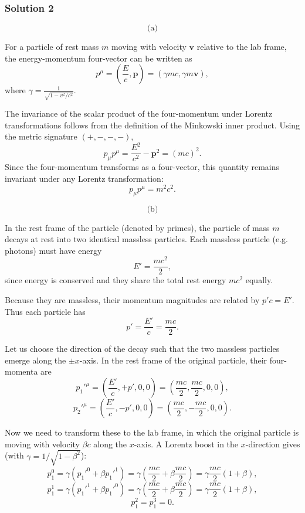\documentclass{article}
\begin{document}
\subsubsection{Solution 2}

\[
\text{(a)}
\]

For a particle of rest mass \(m\) moving with velocity \(\mathbf{v}\) relative to the lab frame, the energy-momentum four-vector can be written as
\[
p^\mu = \left(\frac{E}{c}, \mathbf{p}\right) = \left(\gamma m c, \gamma m \mathbf{v}\right),
\]
where \(\gamma = \frac{1}{\sqrt{1 - v^2/c^2}}\).

The invariance of the scalar product of the four-momentum under Lorentz transformations follows from the definition of the Minkowski inner product. Using the metric signature \((+,-,-,-)\),
\[
p_\mu p^\mu = \frac{E^2}{c^2} - \mathbf{p}^2 = (m c)^2.
\]
Since the four-momentum transforms as a four-vector, this quantity remains invariant under any Lorentz transformation:
\[
p_\mu p^\mu = m^2 c^2.
\]

\[
\text{(b)}
\]

In the rest frame of the particle (denoted by primes), the particle of mass \(m\) decays at rest into two identical massless particles. Each massless particle (e.g. photons) must have energy
\[
E' = \frac{m c^2}{2},
\]
since energy is conserved and they share the total rest energy \(m c^2\) equally.

Because they are massless, their momentum magnitudes are related by \(p' c = E'\). Thus each particle has
\[
p' = \frac{E'}{c} = \frac{m c}{2}.
\]

Let us choose the direction of the decay such that the two massless particles emerge along the \(\pm x\)-axis. In the rest frame of the original particle, their four-momenta are
\[
p_1'^\mu = \left(\frac{E'}{c}, +p', 0, 0\right) = \left(\frac{m c}{2}, \frac{m c}{2}, 0, 0\right),
\]
\[
p_2'^\mu = \left(\frac{E'}{c}, -p', 0, 0\right) = \left(\frac{m c}{2}, -\frac{m c}{2}, 0, 0\right).
\]

Now we need to transform these to the lab frame, in which the original particle is moving with velocity \(\beta c\) along the \(x\)-axis. A Lorentz boost in the \(x\)-direction gives (with \(\gamma = 1/\sqrt{1-\beta^2}\)):
\[
p_1^0 = \gamma \left(p_1'^0 + \beta p_1'^1\right) = \gamma\left(\frac{m c}{2} + \beta \frac{m c}{2}\right) = \gamma \frac{m c}{2}(1+\beta),
\]
\[
p_1^1 = \gamma \left(p_1'^1 + \beta p_1'^0\right) = \gamma\left(\frac{m c}{2} + \beta \frac{m c}{2}\right) = \gamma \frac{m c}{2}(1+\beta),
\]
\[
p_1^2 = p_1^3 = 0.
\]
\end{document}
